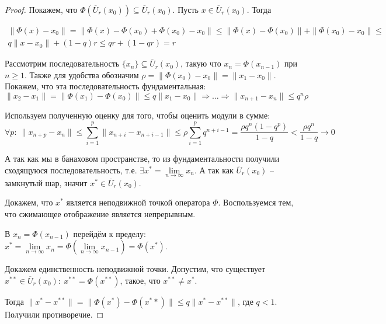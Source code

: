 \documentclass[a4paper,12pt]{article}
\renewcommand{\leq}{\ensuremath{\leqslant}}
\renewcommand{\geq}{\ensuremath{\geqslant}}
\theoremstyle{plain}
\theoremstyle{definition}
\theoremstyle{remark}
\begin{document}
\begin{proof}
	Покажем, что $\Phi(\overline{U}_r(x_0)) \subseteq \overline{U}_r(x_0)$. Пусть $x \in \overline{U}_r(x_0)$. Тогда

	\begin{align*}
		\|\Phi(x) - x_0\| = \|\Phi(x) - \Phi(x_0) + \Phi(x_0) - x_0\| \leq \|\Phi(x) - \Phi(x_0)\| + \|\Phi(x_0) - x_0\| \leq \\
		q\|x - x_0\| + (1 - q)r \leq qr + (1 - qr) = r
	\end{align*}

	Рассмотрим последовательность $\{x_n\} \subseteq \overline{U}_r(x_0)$, такую что $x_n = \Phi(x_{n - 1})$ при $n \geq 1$. Также для удобства обозначим $\rho = \|\Phi(x_0) - x_0\| = \|x_1 - x_0\|$. Покажем, что эта последовательность фундаментальная:
	\[\|x_2 - x_1\| = \|\Phi(x_1) - \Phi(x_0)\| \leq q \|x_1 - x_0\| \Rightarrow \ldots \Rightarrow \|x_{n + 1} - x_n\| \leq q^n\rho\]

	Используем полученную оценку для того, чтобы оценить модули в сумме:
	\[\forall p:\: \|x_{n + p} - x_n\| \leq \sum_{i = 1}^p \|x_{n + i} - x_{n + i - 1}\| \leq \rho \sum_{i = 1}^p q^{n + i - 1} = \frac{\rho q^n(1 - q^p)}{1 - q} < \frac{\rho q^n}{1 - q} \to 0\]

	А так как мы в банаховом пространстве, то из фундаментальности получили сходящуюся последовательность, т.е. $\exists x^* = \lim\limits_{n \to \infty} x_n$. А так как $\overline{U}_r(x_0)$ -- замкнутый шар, значит $x^* \in \overline{U}_r(x_0)$.

	Докажем, что $x^*$ является неподвижной точкой оператора $\Phi$. Воспользуемся тем, что сжимающее отображение является непрерывным.

	В $x_n = \Phi(x_{n - 1})$ перейдём к пределу: $x^* = \lim\limits_{n \to \infty} x_n = \Phi\left(\lim\limits_{n \to \infty} x_{n - 1}\right) = \Phi(x^*)$.

	Докажем единственность неподвижной точки. Допустим, что существует $x^{**} \in \overline{U}_r(x_0):\: x^{**} = \Phi(x^{**})$, такое, что $x^{**} \neq x^*$.

	Тогда $\|x^* - x^{**}\| = \|\Phi(x^*) - \Phi(x^**)\| \leq q\|x^* - x^{**}\|$, где $q < 1$. Получили противоречие.
\end{proof}
\end{document}
